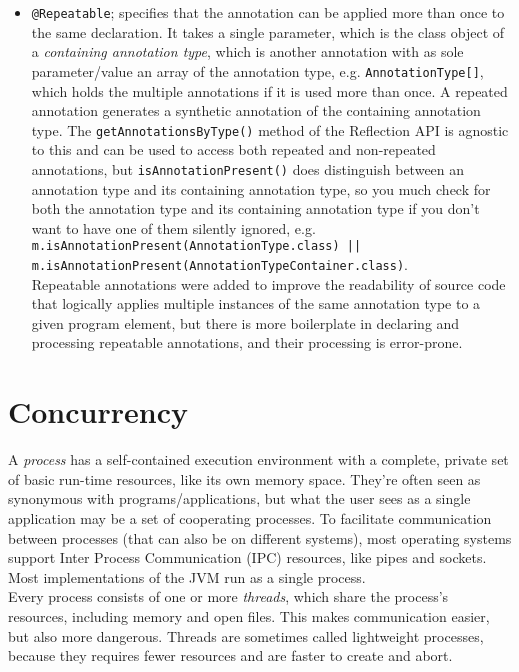 \documentclass[8pt, table, xcdraw]{article}%
\begin{document}
\begin{itemize}
\begin{itemize}
        \item \lstinline{@Repeatable}; specifies that the annotation can be applied more than once to the same declaration. It takes a single parameter, which is the class object of a \emph{containing annotation type}, which is another annotation with as sole parameter/value an array of the annotation type, e.g. \lstinline{AnnotationType[]}, which holds the multiple annotations if it is used more than once. A repeated annotation generates a synthetic annotation of the containing annotation type. The \lstinline{getAnnotationsByType()} method of the Reflection API is agnostic to this and can be used to access both repeated and non-repeated annotations, but \lstinline{isAnnotationPresent()} does distinguish between an annotation type and its containing annotation type, so you much check for both the annotation type and its containing annotation type if you don't want to have one of them silently ignored, e.g. \lstinline{m.isAnnotationPresent(AnnotationType.class) || m.isAnnotationPresent(AnnotationTypeContainer.class)}.\\
        Repeatable annotations were added to improve the readability of source code that logically applies multiple instances of the same annotation type to a given program element, but there is more boilerplate in declaring and processing repeatable annotations, and their processing is error-prone.
    \end{itemize}
\end{itemize}

\section{Concurrency}

A \emph{process} has a self-contained execution environment with a complete, private set of basic run-time resources, like its own memory space. They're often seen as synonymous with programs/applications, but what the user sees as a single application may be a set of cooperating processes. To facilitate communication between processes (that can also be on different systems), most operating systems support Inter Process Communication (IPC) resources, like pipes and sockets. Most implementations of the JVM run as a single process.\\
Every process consists of one or more \emph{threads}, which share the process's resources, including memory and open files. This makes communication easier, but also more dangerous. Threads are sometimes called lightweight processes, because they requires fewer resources and are faster to create and abort.
\end{document}
